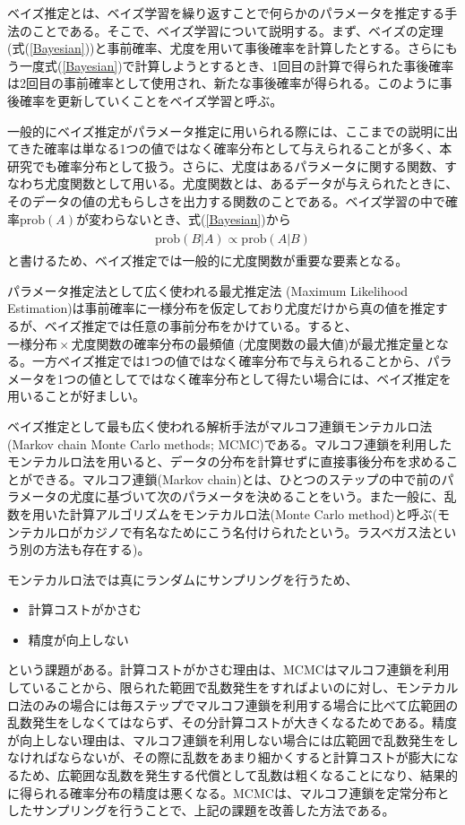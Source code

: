 ベイズ推定とは、ベイズ学習を繰り返すことで何らかのパラメータを推定する手法のことである。そこで、ベイズ学習について説明する。まず、ベイズの定理 (式(\ref{Bayesian}))と事前確率、尤度を用いて事後確率を計算したとする。さらにもう一度式(\ref{Bayesian})で計算しようとするとき、1回目の計算で得られた事後確率は2回目の事前確率として使用され、新たな事後確率が得られる。このように事後確率を更新していくことをベイズ学習と呼ぶ。

一般的にベイズ推定がパラメータ推定に用いられる際には、ここまでの説明に出てきた確率は単なる1つの値ではなく確率分布として与えられることが多く、本研究でも確率分布として扱う。さらに、尤度はあるパラメータに関する関数、すなわち尤度関数として用いる。尤度関数とは、あるデータが与えられたときに、そのデータの値の尤もらしさを出力する関数のことである。ベイズ学習の中で確率$\mathrm{prob}(A)$が変わらないとき、式(\ref{Bayesian})から
\begin{align}
\begin{aligned}
	\mathrm{prob}(B|A) \propto \mathrm{prob}(A|B)
\end{aligned}
\end{align}
と書けるため、ベイズ推定では一般的に尤度関数が重要な要素となる。

パラメータ推定法として広く使われる最尤推定法 (Maximum Likelihood Estimation)は事前確率に一様分布を仮定しており尤度だけから真の値を推定するが、ベイズ推定では任意の事前分布をかけている。すると、$一様分布\times 尤度関数$の確率分布の最頻値 (尤度関数の最大値)が最尤推定量となる。一方ベイズ推定では1つの値ではなく確率分布で与えられることから、パラメータを1つの値としてではなく確率分布として得たい場合には、ベイズ推定を用いることが好ましい。

ベイズ推定として最も広く使われる解析手法がマルコフ連鎖モンテカルロ法(Markov chain Monte Carlo methods; MCMC)である。マルコフ連鎖を利用したモンテカルロ法を用いると、データの分布を計算せずに直接事後分布を求めることができる。マルコフ連鎖(Markov chain)とは、ひとつのステップの中で前のパラメータの尤度に基づいて次のパラメータを決めることをいう。また一般に、乱数を用いた計算アルゴリズムをモンテカルロ法(Monte Carlo method)と呼ぶ(モンテカルロがカジノで有名なためにこう名付けられたという。ラスベガス法という別の方法も存在する)。

モンテカルロ法では真にランダムにサンプリングを行うため、
\begin{itemize}
	\item{計算コストがかさむ}
	\item{精度が向上しない}
\end{itemize}
という課題がある。計算コストがかさむ理由は、MCMCはマルコフ連鎖を利用していることから、限られた範囲で乱数発生をすればよいのに対し、モンテカルロ法のみの場合には毎ステップでマルコフ連鎖を利用する場合に比べて広範囲の乱数発生をしなくてはならず、その分計算コストが大きくなるためである。精度が向上しない理由は、マルコフ連鎖を利用しない場合には広範囲で乱数発生をしなければならないが、その際に乱数をあまり細かくすると計算コストが膨大になるため、広範囲な乱数を発生する代償として乱数は粗くなることになり、結果的に得られる確率分布の精度は悪くなる。MCMCは、マルコフ連鎖を定常分布としたサンプリングを行うことで、上記の課題を改善した方法である。

